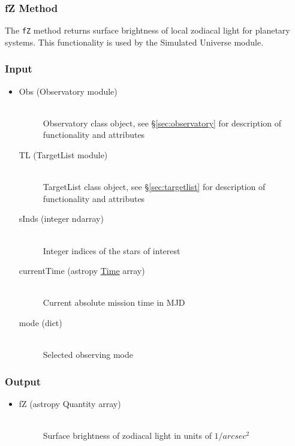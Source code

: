 \documentclass[cleanfoot]{asme2ej}
\begin{document}
\subsubsection{fZ Method} \label{sec:fZtask}
The \verb+fZ+ method returns surface brightness of local zodiacal light for planetary systems.  This functionality is used by the Simulated Universe module.

\subsubsection*{Input}
\begin{itemize}
\item 
\begin{description}
    \item[Obs (Observatory module)] \hfill \\ Observatory class object, see \S\ref{sec:observatory} for description of functionality and attributes       
    \item[TL (TargetList module)] \hfill \\ TargetList class object, see \S\ref{sec:targetlist} for description of functionality and attributes       
    \item[sInds (integer ndarray)] \hfill \\ Integer indices of the stars of interest
    \item[currentTime (astropy \href{http://astropy.readthedocs.org/en/latest/time/index.html}{Time} array)] \hfill \\ Current absolute mission time in MJD    
    \item[mode (dict)] \hfill \\ Selected observing mode
\end{description}
\end{itemize}

\subsubsection*{Output}
\begin{itemize}
\item 
\begin{description}
    \item[fZ (astropy Quantity array)] \hfill \\ Surface brightness of zodiacal light in units of $ 1/arcsec^2 $
\end{description}
\end{itemize}
\end{document}
